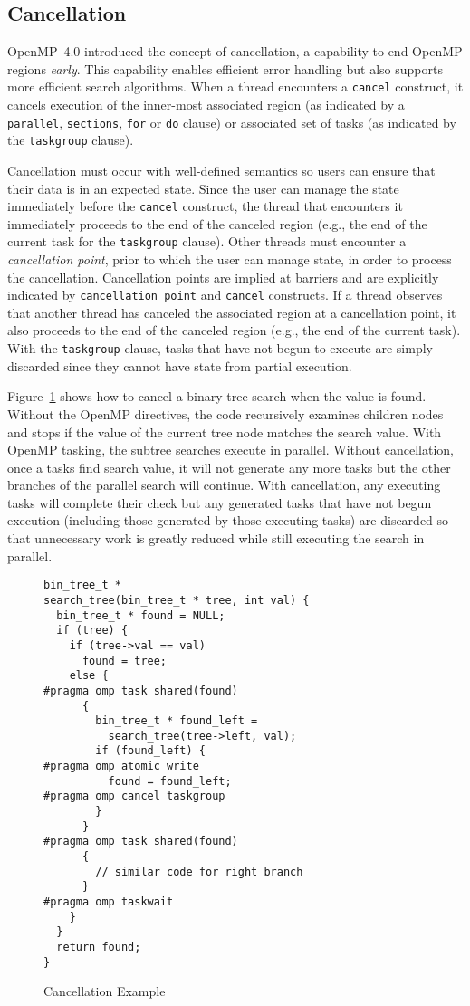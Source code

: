 \subsection{Cancellation}
\label{sec:Cancellation}
OpenMP~4.0 introduced the concept of cancellation, a capability to end 
OpenMP regions \emph{early}. This capability enables efficient error
handling but also supports more efficient search algorithms. When a thread
encounters a \texttt{cancel} construct, it cancels execution of the 
inner-most associated region (as indicated by a \texttt{parallel}, 
\texttt{sections}, \texttt{for} or \texttt{do} clause) or associated set 
of tasks (as indicated by the \texttt{taskgroup} clause). 

Cancellation must occur with well-defined semantics so users can ensure 
that their data is in an expected state. Since the user can manage the 
state immediately before the \texttt{cancel} construct, the thread 
that encounters it immediately proceeds to the end of the canceled region 
(e.g., the end of the current task for the \texttt{taskgroup} clause). Other
threads must encounter a \emph{cancellation point}, prior to which the user 
can manage state, in order to process the cancellation. Cancellation points 
are implied at barriers and are explicitly indicated by 
\texttt{cancellation point} and \texttt{cancel} constructs. If a thread 
observes that another thread has canceled the associated region at a 
cancellation point, it also proceeds to the end of the canceled region 
(e.g., the end of the current task). With the \texttt{taskgroup} clause, 
tasks that have not begun to execute are simply discarded since they cannot 
have state from partial execution.

Figure~\ref{fig:Cancellation} shows how to cancel a binary tree search when 
the value is found. Without the OpenMP directives, the code recursively 
examines children nodes and stops if the value of the current tree node 
matches the search value. With OpenMP tasking, the subtree searches execute
in parallel. Without cancellation, once a tasks find search value, it will 
not generate any more tasks but the other branches of the parallel search 
will continue. With cancellation, any executing tasks will complete their 
check but any generated tasks that have not begun execution (including those 
generated by those executing tasks) are discarded so that unnecessary work 
is greatly reduced while still executing the search in parallel.

\begin{figure}
\begin{verbatim}
bin_tree_t *
search_tree(bin_tree_t * tree, int val) {
  bin_tree_t * found = NULL;
  if (tree) {
    if (tree->val == val)
      found = tree;
    else {
#pragma omp task shared(found)
      {
        bin_tree_t * found_left =
          search_tree(tree->left, val);
        if (found_left) {
#pragma omp atomic write
          found = found_left;
#pragma omp cancel taskgroup
        }
      }
#pragma omp task shared(found)
      {
        // similar code for right branch
      }
#pragma omp taskwait
    }
  }
  return found;
}
\end{verbatim}
\caption{Cancellation Example\label{fig:Cancellation}}
\end{figure}


